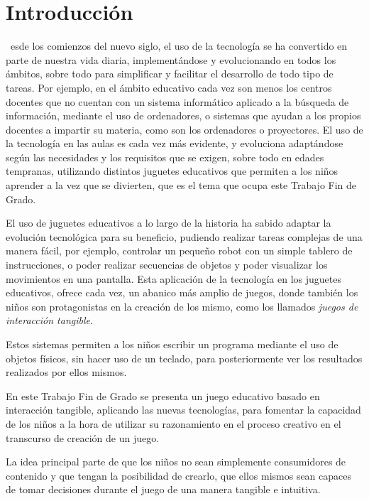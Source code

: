 \chapter{Introducción}

\noindent
{}~esde los comienzos del nuevo siglo, el uso de la tecnología se ha convertido en parte de nuestra vida diaria, implementándose y evolucionando en todos los ámbitos, sobre todo para simplificar y facilitar el desarrollo de todo tipo de tareas. Por ejemplo, en el ámbito educativo cada vez son menos los centros docentes que no cuentan con un sistema informático aplicado a la búsqueda de información, mediante el uso de ordenadores, o sistemas que ayudan a los propios docentes a impartir su materia, como son los ordenadores o proyectores. El uso de la tecnología en las aulas es cada vez más evidente, y evoluciona adaptándose según las necesidades y los requisitos que se exigen, sobre todo en edades tempranas, utilizando distintos juguetes educativos que permiten a los niños aprender a la vez que se divierten, que es el tema que ocupa este Trabajo Fin de Grado.

El uso de juguetes educativos a lo largo de la historia ha sabido adaptar la evolución tecnológica para su beneficio, pudiendo realizar tareas complejas de una manera fácil, por ejemplo, controlar un pequeño robot con un simple tablero de instrucciones, o poder realizar secuencias de objetos y poder visualizar los movimientos en una pantalla. Esta aplicación de la tecnología en los juguetes educativos, ofrece cada vez, un abanico más amplio de juegos, donde también los niños son protagonistas en la creación de los mismo, como los llamados \emph{juegos de interacción tangible}.

Estos sistemas permiten a los niños escribir un programa mediante el uso de objetos físicos, sin hacer uso de un teclado, para posteriormente ver los resultados realizados por ellos mismos.

En este Trabajo Fin de Grado se presenta un juego educativo basado en interacción tangible, aplicando las nuevas tecnologías, para fomentar la capacidad de los niños a la hora de utilizar su razonamiento en el proceso creativo en el transcurso de creación de un juego. 

La idea principal parte de que los niños no sean simplemente consumidores de contenido y que tengan la posibilidad de crearlo, que ellos mismos sean capaces de tomar decisiones durante el juego de una manera tangible e intuitiva.




